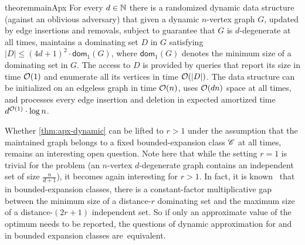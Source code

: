 \begin{restatable}{theorem}{mainApx}\label{thm:apx-dynamic}
For every $d\in \mathbb{N}$ there is a randomized dynamic data structure (against an oblivious adversary) that given a dynamic $n$-vertex graph $G$, updated by edge insertions and removals, subject to guarantee that $G$ is $d$-degenerate at all times, maintains a dominating set $D$ in $G$ satisfying $|D|\leq (4d+1)^2\cdot \mathsf{dom}_1(G)$, where $\mathsf{dom}_1(G)$ denotes the minimum size of a dominating set in $G$. The access to $D$ is provided by queries that report its size in time $\mathcal{O}(1)$ and enumerate all its vertices in time $\mathcal{O}(|D|)$. The data structure can be initialized on an edgeless graph in time $\mathcal{O}(n)$, uses $\mathcal{O}(dn)$ space at all times, and processes every edge insertion and deletion in expected amortized time $d^{\mathcal{O}(1)}\cdot \log n$.
\end{restatable}

Whether \cref{thm:apx-dynamic} can be lifted to $r>1$ under the assumption that the maintained graph belongs to a fixed bounded-expansion class $\mathscr C$ at all times, remains an interesting open question. Note here that while the setting $r=1$ is trivial for the  problem (an $n$-vertex $d$-degenerate graph contains an independent set of size $\frac{n}{d+1}$), it becomes again interesting for $r>1$. In fact, it is known~\cite{Dvorak13} that in bounded-expansion classes, there is a constant-factor multiplicative gap between the minimum size of a distance-$r$ dominating set and the maximum size of a distance-$(2r+1)$ independent set. So if only an approximate value of the optimum needs to be reported, the questions of dynamic approximation for  and  in bounded expansion classes are~equivalent.

